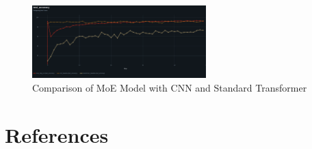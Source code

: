 \documentclass[a4paper,11pt]{article}
\begin{document}
\begin{figure}[H]
    \centering
    \includegraphics[width=0.6\textwidth]{images/baselines.png}
    \caption{Comparison of MoE Model with CNN and Standard Transformer}
    \label{fig:baselines}
\end{figure}


\section{References}

\renewcommand{\section}[2]{}%

% 


\end{document}

